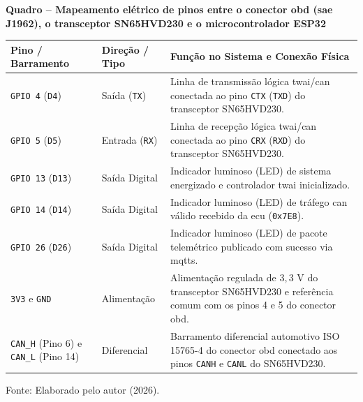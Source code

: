 \documentclass[
	12pt,				%
	openright,			%
	twoside,			%
	a4paper,			%
	english,			%
	brazil				%
	]{abntex2}
\newcounter{quadro}
\begin{document}
\begin{table}[!htb]
\centering
{}\label{quad:pinout}
{\footnotesize
\textbf{Quadro \thequadro{} -- Mapeamento elétrico de pinos entre o conector
\acrshort{obd} (\acrshort{sae} J1962), o transceptor SN65HVD230 e o microcontrolador
ESP32}\par}
\vspace{4pt}
{\footnotesize
\begin{tabular}{|>{\raggedright\arraybackslash}p{3.1cm}|l|>{\raggedright\arraybackslash}p{8.6cm}|}
\hline
\textbf{Pino / Barramento} & \textbf{Direção / Tipo}
    & \textbf{Função no Sistema e Conexão Física} \\ \hline
\texttt{GPIO 4} (\texttt{D4}) & Saída (\texttt{TX})
    & Linha de transmissão lógica \acrshort{twai}/\acrshort{can} conectada ao pino
    \texttt{CTX} (\texttt{TXD}) do transceptor SN65HVD230. \\ \hline
\texttt{GPIO 5} (\texttt{D5}) & Entrada (\texttt{RX})
    & Linha de recepção lógica \acrshort{twai}/\acrshort{can} conectada ao pino
    \texttt{CRX} (\texttt{RXD}) do transceptor SN65HVD230. \\ \hline
\texttt{GPIO 13} (\texttt{D13}) & Saída Digital
    & Indicador luminoso (LED) de sistema energizado e controlador \acrshort{twai}
    inicializado. \\ \hline
\texttt{GPIO 14} (\texttt{D14}) & Saída Digital
    & Indicador luminoso (LED) de tráfego \acrshort{can} válido recebido da
    \acrshort{ecu} (\texttt{0x7E8}). \\ \hline
\texttt{GPIO 26} (\texttt{D26}) & Saída Digital
    & Indicador luminoso (LED) de pacote telemétrico publicado com sucesso via
    \acrshort{mqtts}. \\ \hline
\texttt{3V3} e \texttt{GND} & Alimentação
    & Alimentação regulada de $3{,}3\text{ V}$ do transceptor SN65HVD230 e referência
    comum com os pinos 4 e 5 do conector \acrshort{obd}. \\ \hline
\texttt{CAN\_H} (Pino 6) e \texttt{CAN\_L} (Pino 14) & Diferencial
    & Barramento diferencial automotivo ISO 15765-4 do conector \acrshort{obd} conectado
    aos pinos \texttt{CANH} e \texttt{CANL} do SN65HVD230. \\ \hline
\end{tabular}\par}
\vspace{4pt}
{\footnotesize\raggedright
Fonte: Elaborado pelo autor (2026).\par}
\end{table}
\end{document}
